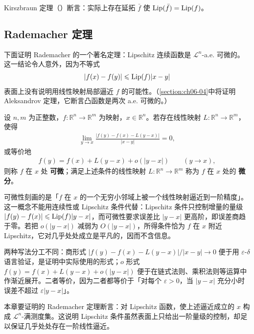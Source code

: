 \documentclass[../../main.tex]{subfiles}%
\begin{document}
\begin{remark}\label{remark:ch03-thm-3-1-改进}
Kirszbraun 定理（\cite[第 2.10.43 节]{federer1969}）断言：实际上存在延拓 $\bar f$ 使 $\operatorname{Lip}(\bar f)=\operatorname{Lip}(f)$。
\end{remark}

\subsection{Rademacher 定理}\label{subsection:ch03-01-2}

下面证明 Rademacher 的一个著名定理：Lipschitz 连续函数是 $\mathcal{L}^n$-a.e. 可微的。这一结论令人意外，因为不等式
\begin{align*}
\lvert f(x)-f(y)\rvert\leqslant\operatorname{Lip}(f)\lvert x-y\rvert
\end{align*}
表面上没有说明用线性映射局部逼近 $f$ 的可能性。（\cref{section:ch06-04}中将证明 Aleksandrov 定理，它断言凸函数是两次 a.e. 可微的。）%

\begin{definition}[可微性]\label{definition:ch03-3-2}
设 $n,m$ 为正整数，$f:\mathbb{R}^n\to\mathbb{R}^m$ 为映射，$x\in\mathbb{R}^n$。若存在线性映射 $L:\mathbb{R}^n\to\mathbb{R}^m$，使得
\begin{align*}
\lim_{y\to x}\frac{\lvert f(y)-f(x)-L(y-x)\rvert}{\lvert x-y\rvert}=0,
\end{align*}
或等价地
\begin{align*}
f(y)=f(x)+L(y-x)+o(\lvert y-x\rvert)\qquad(y\to x),
\end{align*}
则称 $f$ 在 $x$ 处 \textbf{可微}；满足上述条件的线性映射 $L:\mathbb{R}^n\to\mathbb{R}^m$ 称为 $f$ 在 $x$ 处的 \textbf{微分}。
\end{definition}

\begin{remark}\label{remark:ch03-def-3-2-动机}
可微性刻画的是「$f$ 在 $x$ 的一个无穷小邻域上被一个线性映射逼近到一阶精度」。这一概念不能用连续性或 Lipschitz 条件代替：Lipschitz 条件只控制增量的量级 $\lvert f(y)-f(x)\rvert\leqslant\operatorname{Lip}(f)\lvert y-x\rvert$，而可微性要求误差比 $\lvert y-x\rvert$ 更高阶，即误差商趋于零。若把 $o(\lvert y-x\rvert)$ 减弱为 $O(\lvert y-x\rvert)$，所得条件恰为 $f$ 在 $x$ 附近 Lipschitz，它对几乎处处成立是平凡的，因而不含信息。

两种写法分工不同：商形式 $\lvert f(y)-f(x)-L(y-x)\rvert/\lvert x-y\rvert\to0$ 便于用 $\varepsilon$-$\delta$ 语言验证，是证明中实际使用的形式；$o$ 形式 $f(y)=f(x)+L(y-x)+o(\lvert y-x\rvert)$ 便于在链式法则、乘积法则等运算中作渐近展开。二者等价，因为二者都等价于「对每个 $\varepsilon>0$，当 $\lvert y-x\rvert$ 充分小时误差不超过 $\varepsilon\lvert y-x\rvert$」。

本章要证明的 Rademacher 定理断言：对 Lipschitz 函数，使上述逼近成立的 $x$ 构成 $\mathcal{L}^n$-满测度集。这说明 Lipschitz 条件虽然表面上只给出一阶量级的控制，却足以保证几乎处处存在一阶线性逼近。
\end{remark}
\end{document}
